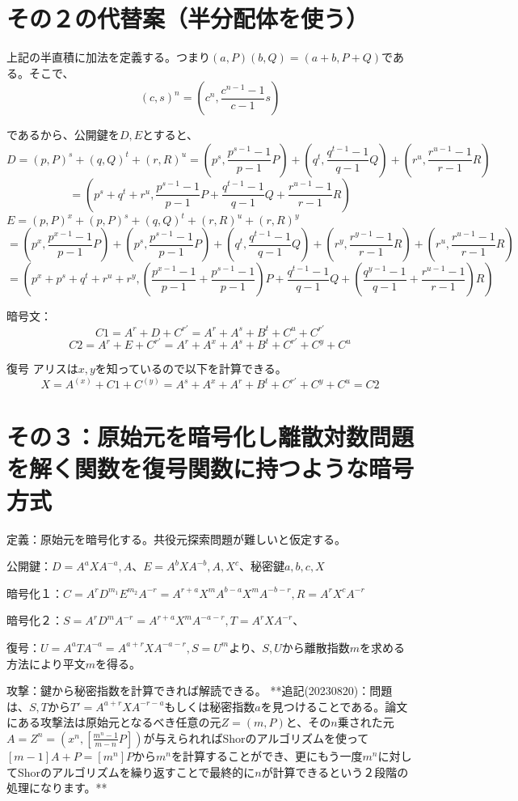 \documentclass[
]{article}
\begin{document}
\section{その２の代替案（半分配体を使う）}
上記の半直積に加法を定義する。つまり$(a,P)(b,Q)=(a+b,P+Q)$である。そこで、
$$(c,s)^n=(c^n,\frac{c^{n-1}-1}{c-1}s)$$

であるから、公開鍵を$D,E$とすると、
$$D=(p,P)^s+(q,Q)^t+(r,R)^u=(p^s,\frac{p^{s-1}-1}{p-1}P)+(q^t,\frac{q^{t-1}-1}{q-1}Q)+(r^u,\frac{r^{u-1}-1}{r-1}R)$$
$$=(p^s+q^t+r^u,\frac{p^{s-1}-1}{p-1}P+\frac{q^{t-1}-1}{q-1}Q+\frac{r^{u-1}-1}{r-1}R)$$
$E=(p,P)^x+(p,P)^s+(q,Q)^t+(r,R)^u+(r,R)^y$
$$=(p^x,\frac{p^{x-1}-1}{p-1}P)+(p^s,\frac{p^{s-1}-1}{p-1}P)+(q^t,\frac{q^{t-1}-1}{q-1}Q)+(r^y,\frac{r^{y-1}-1}{r-1}R)+(r^u,\frac{r^{u-1}-1}{r-1}R)$$
$$=(p^x+p^{s}+q^t+r^{u}+r^y,(\frac{p^{x-1}-1}{p-1}+\frac{p^{s-1}-1}{p-1})P+\frac{q^{t-1}-1}{q-1}Q+(\frac{q^{y-1}-1}{q-1}+\frac{r^{u-1}-1}{r-1})R)$$

暗号文：
$$C1=A^r+D+C^{r'}=A^{r}+A^s+B^t+C^u+C^{r'}$$
$$C2=A^{r}+E+C^{r'}=A^r+A^x+A^s+B^t+C^{r'}+C^y+C^u$$

復号
アリスは$x,y$を知っているので以下を計算できる。
$$X=A^{(x)}+C1+C^{(y)}=A^{s}+A^x+A^r+B^t+C^{r'}+C^y+C^u=C2$$

\section{その３：原始元を暗号化し離散対数問題を解く関数を復号関数に持つような暗号方式}
定義：原始元を暗号化する。共役元探索問題が難しいと仮定する。

公開鍵：$D=A^aXA^{-a},A$、$E=A^bXA^{-b},A,X^c$、秘密鍵$a,b,c,X$

暗号化１：$C=A^rD^{m_1}E^{m_2}A^{-r}=A^{r+a}X^{m}A^{b-a}X^{m}A^{-b-r},R=A^rX^cA^{-r}$

暗号化２：$S=A^rD^mA^{-r}=A^{r+a}X^mA^{-a-r},T=A^rXA^{-r}$、

復号：$U=A^aTA^{-a}=A^{a+r}XA^{-a-r},S=U^m$より、$S,U$から離散指数$m$を求める方法により平文$m$を得る。

攻撃：鍵から秘密指数を計算できれば解読できる。
**追記(20230820)：問題は、$S,T$から$T'=A^{a+r}XA^{-r-a}$もしくは秘密指数$a$を見つけることである。論文にある攻撃法は原始元となるべき任意の元$Z=(m,P)$と、その$n$乗された元$A=Z^n=(x^n,[\frac{m^n-1}{m-n}P])$が与えられればShorのアルゴリズムを使って$[m-1]A+P=[m^n]P$から$m^n$を計算することができ、更にもう一度$m^n$に対してShorのアルゴリズムを繰り返すことで最終的に$n$が計算できるという２段階の処理になります。**
\end{document}
